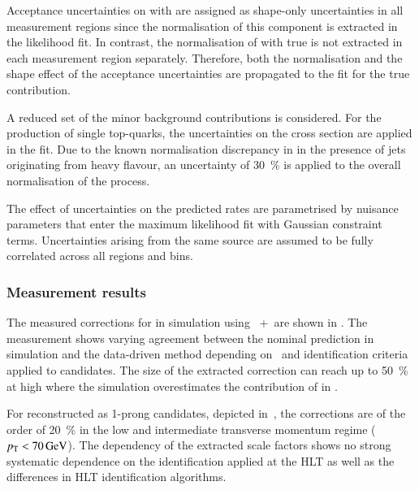 Acceptance uncertainties on \ttbar with \faketauhadvis are assigned as
shape-only uncertainties in all measurement regions since the
normalisation of this component is extracted in the likelihood fit.
In contrast, the normalisation of \ttbar with true \tauhadvis is not
extracted in each measurement region separately. Therefore, both the
normalisation and the shape effect of the \ttbar acceptance
uncertainties are propagated to the fit for the true \tauhadvis
contribution.

A reduced set of the minor background contributions is considered. For
the production of single top-quarks, the uncertainties on the cross
section are applied in the fit. Due to the known normalisation
discrepancy in \Vjets in the presence of jets originating from heavy
flavour, an uncertainty of \SI{30}{\percent} is applied to the overall
normalisation of the process.

The effect of uncertainties on the predicted rates are parametrised by
nuisance parameters that enter the maximum likelihood fit with
Gaussian constraint terms. Uncertainties arising from the same source
are assumed to be fully correlated across all regions and bins.



\subsubsection{Measurement results}

The measured corrections for \faketauhadvis in \ttbar simulation using
\POWHEGBOX[v2]~+~\PYTHIA[8] are shown in
. The measurement shows varying agreement
between the nominal prediction in simulation and the data-driven
method depending on \tauhadvis~\pT and identification criteria applied
to \tauhadvis candidates. The size of the extracted correction can
reach up to \SI{50}{\percent} at high \tauhadvis \pT where the
simulation overestimates the contribution of \faketauhadvis in \ttbar.

For \faketauhadvis reconstructed as 1-prong \tauhadvis candidates,
depicted in~,
the corrections are of the order of \SI{20}{\percent} in the low and
intermediate transverse momentum regime
(\tauhadvis $\pT < \SI{70}{\GeV}$).  The dependency of the extracted
scale factors shows no strong systematic dependence on the \tauhadvis
identification applied at the HLT as well as the differences in HLT
identification algorithms.

